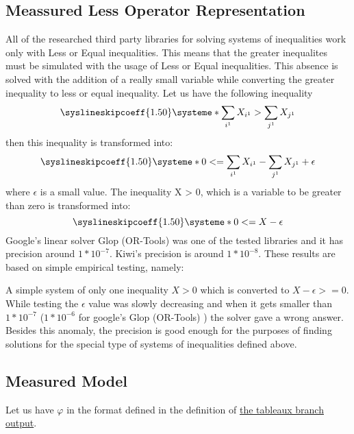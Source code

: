 \documentclass{article}
\begin{document}
		\subsection{Meassured Less Operator Representation}
		All of the researched third party libraries for solving systems of inequalities work only with Less or Equal inequalities.
		This means that the greater inequalites must be simulated with the usage of Less or Equal inequalities.
		\newline
		This absence is solved with the addition of a really small variable while converting the greater inequality to 
		less or equal inequality.
		\newline
		Let us have the following inequality
		\[
			\syslineskipcoeff{1.50}
			\systeme*{\sum_{i^1} X_{i^1} > \sum_{j^1} X_{j^1}}
		\]
		then this inequality is transformed into:
		\[
			\syslineskipcoeff{1.50}
			\systeme*{0 <= \sum_{i^1} X_{i^1} - \sum_{j^1} X_{j^1}} + \epsilon
		\]
		where $\epsilon$ is a small value.
		\newline
		The inequality X > 0, which is a variable to be greater than zero is transformed into:
		\[
			\syslineskipcoeff{1.50}
			\systeme*{0 <= X - \epsilon} 
		\]
		\newline
		Google's linear solver Glop (OR-Tools) was one of the tested libraries and it has precision around $1*10^{-7}$.
		Kiwi's precision is around $1*10^{-8}$. 
		\newline
		These results are based on simple empirical testing, namely:

		A simple system of only one inequality $X > 0$ which is converted to $X - \epsilon >= 0$. 
		While testing the $\epsilon$ value was slowly decreasing and when it gets smaller than $1*10^{-7}$
		($1*10^{-6}$ for google's Glop (OR-Tools) ) the solver gave a wrong answer.
		\newline
		\newline
		Besides this anomaly, the precision is good enough for the purposes of finding solutions for the special type
		of systems of inequalities defined above.

	\newpage
	\subsection{Measured Model}
		Let us have $\varphi$ in the format defined in the definition of \hyperref[tableaux:branch:output]{the tableaux branch output}. %
		
\end{document}
